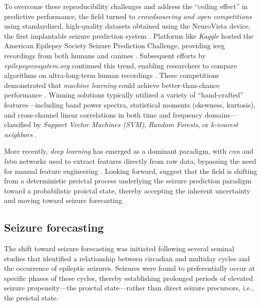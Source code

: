 To overcome these reproducibility challenges and address the \enquote{ceiling effect} in predictive performance, the field turned to \textit{crowdsourcing and open competitions} using standardized, high-quality datasets obtained using the NeuroVista device, the first implantable seizure prediction system \parencite{cook_prediction_2013}. Platforms like \textit{Kaggle} hosted the American Epilepsy Society Seizure Prediction Challenge, providing \gls{ieeg} recordings from both humans and canines \parencite{brinkmann_crowdsourcing_2016}.
Subsequent efforts by \textit{epilepsyecosystem.org} continued this trend, enabling researchers to compare algorithms on ultra-long-term human recordings \parencite{kuhlmann_epilepsyecosystemorg_2018}.
These competitions demonstrated that \textit{machine learning} could achieve better-than-chance performance \parencite{brinkmann_crowdsourcing_2016}.
Winning solutions typically utilized a variety of \enquote{hand-crafted} features---including band power spectra, statistical moments (skewness, kurtosis), and cross-channel linear correlations in both time and frequency domains---classified by \textit{Support Vector Machines (SVM)}, \textit{Random Forests}, or \textit{k-nearest neighbors} \parencite{kuhlmann_epilepsyecosystemorg_2018, muller_coherent_2022}.

More recently, \textit{deep learning} has emerged as a dominant paradigm, with \textit{\gls{cnn}} and \textit{\gls{lstm}} networks used to extract features directly from raw data, bypassing the need for manual feature engineering \parencite{kuhlmann_epilepsyecosystemorg_2018, muller_coherent_2022}.
Looking forward, \textcite{freestone_forward-looking_2017} suggest that the field is shifting from a deterministic preictal process underlying the seizure prediction paradigm toward a probabilistic proictal state, thereby accepting the inherent uncertainty and moving toward seizure forecasting. 


\subsection{Seizure forecasting}
The shift toward seizure forecasting was initiated following several seminal studies that identified a relationship between circadian and multiday cycles and the occurrence of epileptic seizures. Seizures were found to preferentially occur at specific phases of these cycles, thereby establishing prolonged periods of elevated seizure propensity—the proictal state—rather than direct seizure precursors, i.e., the preictal state.


